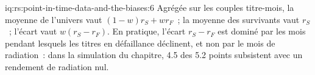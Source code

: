 \begin{solution}{iq:rs:point-in-time-data-and-the-biases:6}
Agrégée sur les couples titre-mois, la moyenne de l'univers vaut $(1 - w)r_S + wr_F$~; la moyenne des survivants vaut $r_S$~; l'écart vaut $w(r_S
- r_F)$. En pratique, l'écart $r_S - r_F$ est dominé par les mois pendant lesquels les titres en défaillance déclinent, et non par le mois de radiation~: dans la
simulation du chapitre, 4.5 des 5.2 points subsistent avec un rendement de radiation nul.
\end{solution}
